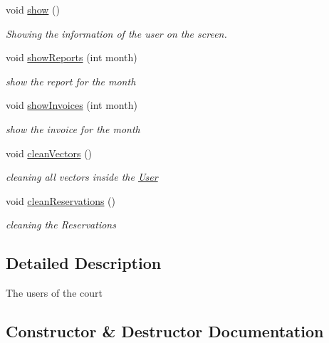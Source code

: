 \begin{DoxyCompactItemize}
\mbox{\label{class_user_ac8a201055d02b313721e56c4c0f6af82}} 
void \mbox{\hyperlink{class_user_ac8a201055d02b313721e56c4c0f6af82}{show}} ()
\begin{DoxyCompactList}\small\item\em Showing the information of the user on the screen. \end{DoxyCompactList}\item 
void \mbox{\hyperlink{class_user_a0fec4842d197ad4cb255f5362f38ef6e}{show\+Reports}} (int month)
\begin{DoxyCompactList}\small\item\em show the report for the month \end{DoxyCompactList}\item 
void \mbox{\hyperlink{class_user_a134a83476c6c006c77e552f22c810ed9}{show\+Invoices}} (int month)
\begin{DoxyCompactList}\small\item\em show the invoice for the month \end{DoxyCompactList}\item 
\mbox{\label{class_user_a3ccbaec58dd37260a34dfa84496b30bd}} 
void \mbox{\hyperlink{class_user_a3ccbaec58dd37260a34dfa84496b30bd}{clean\+Vectors}} ()
\begin{DoxyCompactList}\small\item\em cleaning all vectors inside the \mbox{\hyperlink{class_user}{User}} \end{DoxyCompactList}\item 
\mbox{\label{class_user_ab0637e7ec103b32d040a0bc97be0f178}} 
void \mbox{\hyperlink{class_user_ab0637e7ec103b32d040a0bc97be0f178}{clean\+Reservations}} ()
\begin{DoxyCompactList}\small\item\em cleaning the Reservations \end{DoxyCompactList}\end{DoxyCompactItemize}


\subsection{Detailed Description}
The users of the court 

\subsection{Constructor \& Destructor Documentation}
\mbox{\label{class_user_a898c6748faa70dcd3d30e550be2eb768}} 
